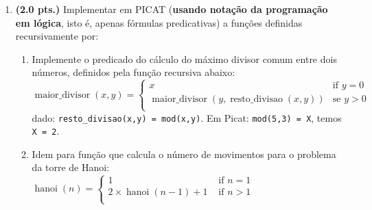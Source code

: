\documentclass[11pt, a4paper,final]{article}
\begin{document}
\begin{enumerate}
\item {\bf (2.0 pts.)} Implementar em PICAT (\textbf{usando notação da programação em lógica}, isto é, apenas fórmulas predicativas) a funções definidas recursivamente por:

\begin{enumerate}
	
	
    \item Implemente o predicado do cálculo do máximo divisor comum entre dois números, definidos pela função recursiva abaixo:\\
$ \operatorname{maior\_divisor}(x,y) =
   \begin{cases}
   x & \mbox{if } y = 0 \\
    \operatorname{maior\_divisor}(y, \operatorname{resto\_divisao}(x,y)) & \mbox{se } y > 0 \\
  \end{cases}
$
\\
 dado: \texttt{resto\_divisao(x,y) = mod(x,y)}. Em  Picat: \texttt{mod(5,3) = X}, temos \texttt{X = 2}.

 \item Idem para função que calcula o número de movimentos para o problema da torre de Hanoi:\\
 $
 \operatorname{hanoi}(n) =
 \begin{cases}
 1 & \mbox{ if } n = 1 \\
 2\times\operatorname{hanoi}(n-1) + 1 & \mbox{ if } n > 1\\
 \end{cases}
 $ 

  
		

\end{enumerate}
\end{enumerate}
\end{document}
